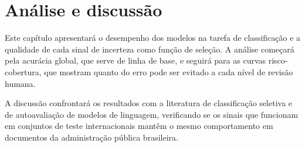 
\section{Análise e discussão}

Este capítulo apresentará o desempenho dos modelos na tarefa de classificação
e a qualidade de cada sinal de incerteza como função de seleção. A análise
começará pela acurácia global, que serve de linha de base, e seguirá para as
curvas risco-cobertura, que mostram quanto do erro pode ser evitado a cada
nível de revisão humana.

A discussão confrontará os resultados com a literatura de classificação
seletiva e de autoavaliação de modelos de linguagem, verificando se os sinais
que funcionam em conjuntos de teste internacionais mantêm o mesmo
comportamento em documentos da administração pública brasileira.
